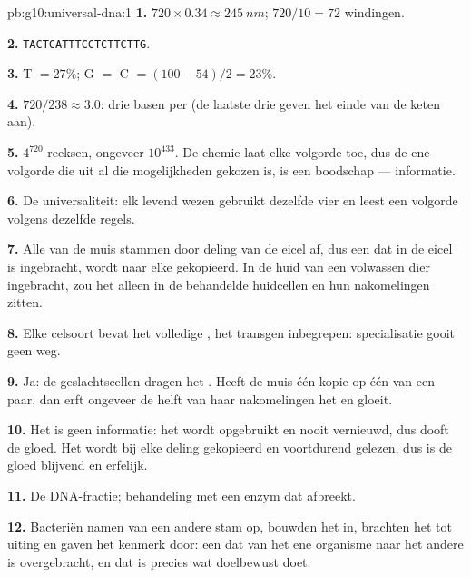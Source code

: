 \begin{solution}{pb:g10:universal-dna:1}
\textbf{1.} $720 \times 0.34 \approx \qty{245}{nm}$; $720/10 = 72$
windingen.

\textbf{2.} \texttt{TACTCATTTCCTCTTCTTG}.

\textbf{3.} T $= 27\%$; G $=$ C $= (100 - 54)/2 = 23\%$.

\textbf{4.} $720/238 \approx 3.0$: drie basen per  (de laatste
drie geven het einde van de keten aan).

\textbf{5.} $4^{720}$ reeksen, ongeveer $10^{433}$. De chemie laat elke
volgorde toe, dus de ene volgorde die uit al die mogelijkheden gekozen
is, is een boodschap --- informatie.

\textbf{6.} De universaliteit: elk levend wezen gebruikt dezelfde vier
 en leest een volgorde volgens dezelfde regels.

\textbf{7.} Alle  van de muis stammen door deling van de eicel af,
dus een  dat in de eicel is ingebracht, wordt naar elke 
gekopieerd. In de huid van een volwassen dier ingebracht, zou het alleen
in de behandelde huidcellen en hun nakomelingen zitten.

\textbf{8.} Elke celsoort bevat het volledige , het transgen
inbegrepen: specialisatie gooit geen  weg.

\textbf{9.} Ja: de geslachtscellen dragen het . Heeft de muis één
kopie op één  van een paar, dan erft ongeveer de helft van
haar nakomelingen het en gloeit.

\textbf{10.} Het  is geen informatie: het wordt opgebruikt en nooit
vernieuwd, dus dooft de gloed. Het  wordt bij elke deling gekopieerd
en voortdurend gelezen, dus is de gloed blijvend en erfelijk.

\textbf{11.} De DNA-fractie; behandeling met een enzym dat  afbreekt.

\textbf{12.} Bacteriën namen  van een andere stam op, bouwden het in,
brachten het tot uiting en gaven het kenmerk door: een  dat van het
ene organisme naar het andere is overgebracht, en dat is precies wat
 doelbewust doet.


\end{solution}
